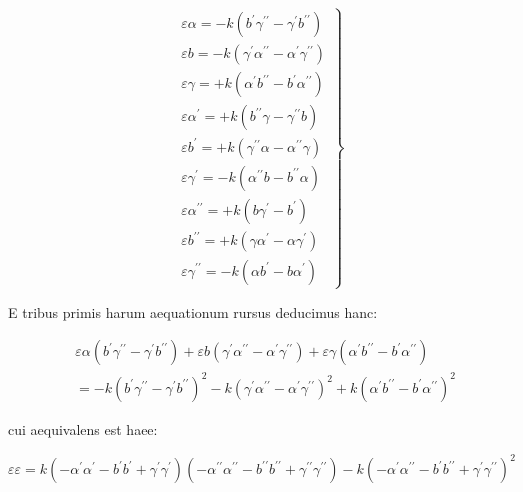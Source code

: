 \documentclass[twoside,12pt, showframe]{memoir}
\begin{document}
\[
\left.\begin{array}{l}
\varepsilon \alpha=-k\left(b^{\prime} \gamma^{\prime \prime}-\gamma^{\prime} b^{\prime \prime}\right) \\
\varepsilon b=-k\left(\gamma^{\prime} \alpha^{\prime \prime}-\alpha^{\prime} \gamma^{\prime \prime}\right) \\
\varepsilon \gamma=+k\left(\alpha^{\prime} b^{\prime \prime}-b^{\prime} \alpha^{\prime \prime}\right) \\
\varepsilon \alpha^{\prime}=+k\left(b^{\prime \prime} \gamma-\gamma^{\prime \prime} b\right) \\
\varepsilon b^{\prime}=+k\left(\gamma^{\prime \prime} \alpha-\alpha^{\prime \prime} \gamma\right) \\
\varepsilon \gamma^{\prime}=-k\left(\alpha^{\prime \prime} b-b^{\prime \prime} \alpha\right) \\
\varepsilon \alpha^{\prime \prime}=+k\left(b \gamma^{\prime}-b^{\prime}\right) \\
\varepsilon b^{\prime \prime}=+k\left(\gamma \alpha^{\prime}-\alpha \gamma^{\prime}\right) \\
\varepsilon \gamma^{\prime \prime}=-k\left(\alpha b^{\prime}-b \alpha^{\prime}\right)
\end{array}\right\}
\]

E tribus primis harum aequationum rursus deducimus hanc:

\[
\begin{aligned}
& \varepsilon \alpha\left(b^{\prime} \gamma^{\prime \prime}-\gamma^{\prime} b^{\prime \prime}\right)+\varepsilon b\left(\gamma^{\prime} \alpha^{\prime \prime}-\alpha^{\prime} \gamma^{\prime \prime}\right)+\varepsilon \gamma\left(\alpha^{\prime} b^{\prime \prime}-b^{\prime} \alpha^{\prime \prime}\right) \\
&=-k\left(b^{\prime} \gamma^{\prime \prime}-\gamma^{\prime} b^{\prime \prime}\right)^{2}-k\left(\gamma^{\prime} \alpha^{\prime \prime}-\alpha^{\prime} \gamma^{\prime \prime}\right)^{2}+k\left(\alpha^{\prime} b^{\prime \prime}-b^{\prime} \alpha^{\prime \prime}\right)^{2}
\end{aligned}
\]

cui aequivalens est haee:

\[
\varepsilon \varepsilon=k\left(-\alpha^{\prime} \alpha^{\prime}-b^{\prime} b^{\prime}+\gamma^{\prime} \gamma^{\prime}\right)\left(-\alpha^{\prime \prime} \alpha^{\prime \prime}-b^{\prime \prime} b^{\prime \prime}+\gamma^{\prime \prime} \gamma^{\prime \prime}\right)-k\left(-\alpha^{\prime} \alpha^{\prime \prime}-b^{\prime} b^{\prime \prime}+\gamma^{\prime} \gamma^{\prime \prime}\right)^{2}
\]
\end{document}
